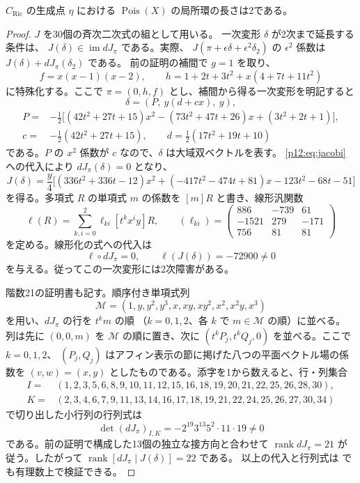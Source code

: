 \begin{theorem}\label{p12:th:double}
$C_{\mathrm{Ric}}$ の生成点 $\eta$ における $\operatorname{Pois}(X)$ の局所環の長さは2である。
\end{theorem}
\begin{proof}
$J$ を30個の斉次二次式の組として用いる。
一次変形 $\delta$ が2次まで延長する条件は、
$J(\delta)\in\operatorname{im} dJ_\pi$ である。実際、
$J(\pi+\epsilon\delta+\epsilon^2\delta_2)$ の $\epsilon^2$ 係数は
$J(\delta)+dJ_\pi(\delta_2)$ である。
前の証明の補間で $g=1$ を取り、
\[
 f=x(x-1)(x-2),\qquad h=1+2t+3t^2+x(4+7t+11t^2)
\]
に特殊化する。ここで $\pi=(0,h,f)$ とし、補間から得る一次変形を明記すると
\[
 \delta=(P,\ y(d+cx),\ y),
\]
\begin{align*}
 P={}&-\tfrac12\bigl[(42t^2+27t+15)x^2
              -(73t^2+47t+26)x+(3t^2+2t+1)\bigr],\\
 c={}&-\tfrac12(42t^2+27t+15),\qquad
 d=\tfrac12(17t^2+19t+10)
\end{align*}
である。$P$ の $x^2$ 係数が $c$ なので、$\delta$ は大域双ベクトルを表す。
\eqref{p12:eq:jacobi} への代入により $dJ_\pi(\delta)=0$ となり、
\[
 J(\delta)=\frac y4\bigl[
 (336t^2+336t-12)x^2+(-417t^2-474t+81)x-123t^2-68t-51\bigr]
\]
を得る。多項式 $R$ の単項式 $m$ の係数を $[m]R$ と書き、線形汎関数
\[
 \ell(R)=\sum_{k,i=0}^2\ell_{ki}[t^kx^iy]R,\qquad
 (\ell_{ki})=
 \begin{pmatrix}
 886&-739&61\\
 -1521&279&-171\\
 756&81&81
 \end{pmatrix}
\]
を定める。線形化の式への代入は
\[
 \ell\circ dJ_\pi=0,\qquad \ell(J(\delta))=-72900\ne0
\]
を与える。従ってこの一次変形には2次障害がある。

階数21の証明書も記す。順序付き単項式列
\[
 \mathcal M=(1,y,y^2,y^3,x,xy,xy^2,x^2,x^2y,x^3)
\]
を用い、$dJ_\pi$ の行を $t^k m$ の順
（$k=0,1,2$、各 $k$ で $m\in\mathcal M$ の順）に並べる。
列は先に $(0,0,m)$ を $\mathcal M$ の順に置き、次に
$(t^kP_j,t^kQ_j,0)$ を並べる。ここで $k=0,1,2$、
$(P_j,Q_j)$ はアフィン表示の節に掲げた八つの平面ベクトル場の係数を
$(v,w)=(x,y)$ としたものである。添字を1から数えると、行・列集合
\begin{align*}
 I={}&(1,2,3,5,6,8,9,10,11,12,15,16,18,19,20,21,22,25,26,28,30),\\
 K={}&(2,3,4,6,7,9,11,13,14,16,17,18,19,21,22,24,25,26,27,30,34)
\end{align*}
で切り出した小行列の行列式は
\[
 \det(dJ_\pi)_{I,K}=-2^{19}3^{13}5^2\cdot11\cdot19\ne0
\]
である。前の証明で構成した13個の独立な接方向と合わせて
$\operatorname{rank}dJ_\pi=21$ が従う。したがって
$\operatorname{rank}[dJ_\pi\mid J(\delta)]=22$ である。
以上の代入と行列式は  でも有理数上で検証できる。


\end{proof}
